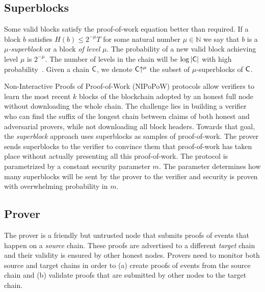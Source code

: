 \subsection{Superblocks}
Some valid blocks satisfy the proof-of-work equation better than required. If
a block $b$ satisfies $H(b) \leq 2^{-\mu} T$ for some natural number
$\mu \in \mathbb{N}$ we say that $b$ is a \emph{$\mu$-superblock} or a block
\emph{of level} $\mu$. The probability of a new valid block achieving level
$\mu$ is $2^{-\mu}$. The number of levels in the chain will be $\log|\mathsf{C}|$
with high probability~\cite{popow}. Given a chain $\mathsf{C}$, we denote
$\mathsf{C}\negthickspace\uparrow^\mu$ the subset of $\mu$-superblocks of $\mathsf{C}$.

Non-Interactive Proofs of Proof-of-Work (NIPoPoW) protocols allow verifiers to
learn the most recent $k$ blocks of the blockchain adopted by an honest full
node without downloading the whole chain. The challenge lies in building a
verifier who can find the suffix of the longest chain between claims of both
honest and adversarial provers, while not downloading all block headers. Towards
that goal, the \emph{superblock} approach uses superblocks as samples of
proof-of-work. The prover sends superblocks to the verifier to convince them
that proof-of-work has taken place without actually presenting all this
proof-of-work. The protocol is parametrized by a constant security parameter
$m$. The parameter determines how many superblocks will be sent by the prover to
the verifier and security is proven with overwhelming probability in $m$.

\subsection{Prover} The prover is a friendly but untrusted node that
submits proofs of events that happen on a \emph{source} chain. These proofs are
advertised to a different \emph{target} chain and their validity is ensured by
other honest nodes. Provers need to monitor both source and target chains in
order to (a) create proofs of events from the source chain and (b) validate
proofs that are submitted by other nodes to the target chain.

